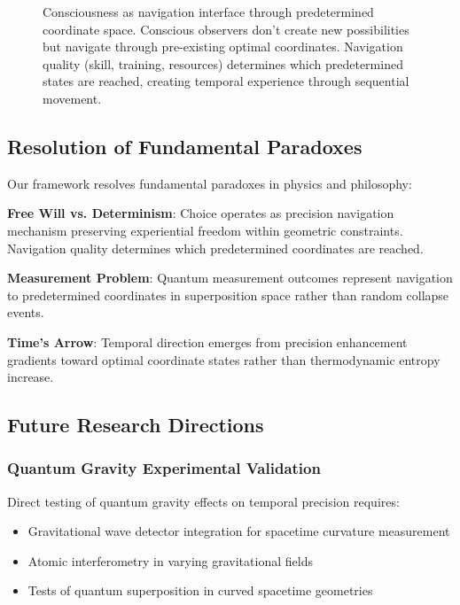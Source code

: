 \documentclass[12pt,a4paper]{article}
\begin{document}
{{{{{{{{{{{{{{\begin{figure}[h]
\begin{tikzpicture}[scale=1.0]
\end{tikzpicture}
\caption{Consciousness as navigation interface through predetermined coordinate space. Conscious observers don't create new possibilities but navigate through pre-existing optimal coordinates. Navigation quality (skill, training, resources) determines which predetermined states are reached, creating temporal experience through sequential movement.}
\label{fig:consciousness_navigation}
\end{figure}

\subsection{Resolution of Fundamental Paradoxes}

Our framework resolves fundamental paradoxes in physics and philosophy:

\textbf{Free Will vs. Determinism}: Choice operates as precision navigation mechanism preserving experiential freedom within geometric constraints. Navigation quality determines which predetermined coordinates are reached.

\textbf{Measurement Problem}: Quantum measurement outcomes represent navigation to predetermined coordinates in superposition space rather than random collapse events.

\textbf{Time's Arrow}: Temporal direction emerges from precision enhancement gradients toward optimal coordinate states rather than thermodynamic entropy increase.

\subsection{Future Research Directions}

\subsubsection{Quantum Gravity Experimental Validation}

Direct testing of quantum gravity effects on temporal precision requires:

\begin{itemize}
\item Gravitational wave detector integration for spacetime curvature measurement
\item Atomic interferometry in varying gravitational fields
\item Tests of quantum superposition in curved spacetime geometries
\end{itemize}

}}}}}}}}}}}}}}
\end{document}
